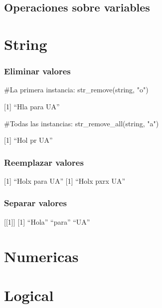 \documentclass[
  letterpaper,
  DIV=11,
  numbers=noendperiod]{scrreprt}
\newenvironment{Shaded}{\begin{snugshade}}{\end{snugshade}}
\newcommand{\CommentTok}[1]{\textcolor[rgb]{0.37,0.37,0.37}{#1}}
\newcommand{\FunctionTok}[1]{\textcolor[rgb]{0.28,0.35,0.67}{#1}}
\newcommand{\NormalTok}[1]{\textcolor[rgb]{0.00,0.23,0.31}{#1}}
\newcommand{\StringTok}[1]{\textcolor[rgb]{0.13,0.47,0.30}{#1}}
\begin{document}
\section{Operaciones sobre variables}\label{operaciones-sobre-variables}

\chapter{String}

\subsection{Eliminar valores}\label{eliminar-valores}

\begin{Shaded}
\begin{Highlighting}[]
\CommentTok{\#La primera instancia:}
\FunctionTok{str\_remove}\NormalTok{(string, }\StringTok{"o"}\NormalTok{)}
\end{Highlighting}
\end{Shaded}

{[}1{]} ``Hla para UA''

\begin{Shaded}
\begin{Highlighting}[]
\CommentTok{\#Todas las instancias:}
\FunctionTok{str\_remove\_all}\NormalTok{(string, }\StringTok{"a"}\NormalTok{)}
\end{Highlighting}
\end{Shaded}

{[}1{]} ``Hol pr UA''

\subsection{Reemplazar valores}\label{reemplazar-valores}

{[}1{]} ``Holx para UA'' {[}1{]} ``Holx pxrx UA''

\subsection{Separar valores}\label{separar-valores}

{[}{[}1{]}{]} {[}1{]} ``Hola'' ``para'' ``UA''

\chapter{Numericas}

\chapter{Logical}
\end{document}
